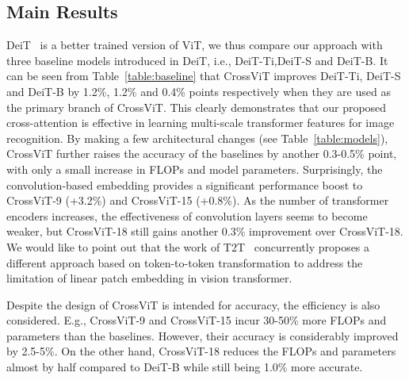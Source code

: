 \documentclass[10pt,twocolumn,letterpaper]{article}
\def\ours{CrossViT\xspace}
\newcommand{\myparagraphfirst}[1]{\vspace{0mm} \noindent {\textbf{#1}}}
\begin{document}
 \subsection{Main Results}
\myparagraphfirst{Comparisons with DeiT.}
DeiT~\cite{DeiT_touvron2020} is a better trained version of ViT, we thus compare our approach with three baseline models introduced in DeiT, i.e., DeiT-Ti,DeiT-S and DeiT-B. It can be seen from Table~\ref{table:baseline} that \ours improves DeiT-Ti, DeiT-S and DeiT-B by 1.2\%, 1.2\% and 0.4\% points respectively when they are used as the primary branch of \ours. This clearly demonstrates that our proposed cross-attention is effective in learning multi-scale transformer features for image recognition.
By making a few architectural changes (see Table~\ref{table:models}), \ours further raises the accuracy of the baselines by another 0.3-0.5\% point, with only a small increase in FLOPs and model parameters. Surprisingly, the convolution-based embedding provides a significant performance boost to \ours-9 (+3.2\%) and \ours-15 (+0.8\%). As the number of transformer encoders increases, the effectiveness of convolution layers seems to become weaker, but \ours-18 still gains another 0.3\% improvement over \ours-18. We would like to point out that the work of T2T~\cite{tokenstotoken_yuan2021} concurrently proposes a different approach based on token-to-token transformation to address the limitation of linear patch embedding in vision transformer.

Despite the design of \ours is intended for accuracy, the efficiency is also considered. E.g., 
\ours-9 and \ours-15 incur 30-50\% more FLOPs and parameters than the baselines. However, their accuracy is considerably improved by 2.5-5\%. On the other hand, \ours-18 reduces the FLOPs and parameters almost by half compared to DeiT-B while still being 1.0\% more accurate. 
\end{document}
